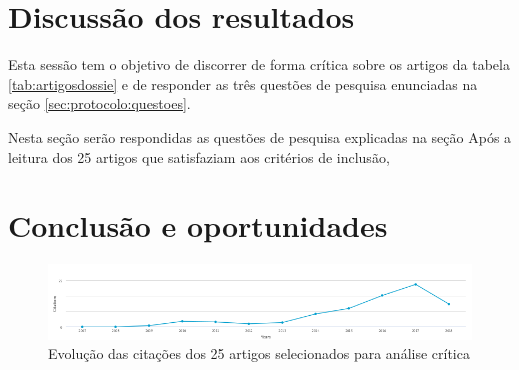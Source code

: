 \documentclass[10pt,journal,compsoc]{IEEEtran}
\begin{document}
\section{Discussão dos resultados}
\label{sec:discussao}
Esta sessão tem o objetivo de discorrer de forma crítica sobre os
artigos da tabela \ref{tab:artigosdossie} e de responder as três questões
de pesquisa enunciadas na seção \ref{sec:protocolo:questoes}.





Nesta seção serão respondidas as questões de pesquisa explicadas na
seção \cite{sec:protocolo:questoes} 
Após a leitura dos 25 artigos que satisfaziam aos critérios de
inclusão, 

\section{Conclusão e oportunidades}
\label{sec:conclusao}
\begin{figure}[!t]
\centering
\includegraphics[scale=0.8]{evolucao_citacoes}
\caption{Evolução das citações dos 25 artigos selecionados para
  análise crítica}
\label{fig:evolcitacoes}
\end{figure}

%
%
\end{document}
